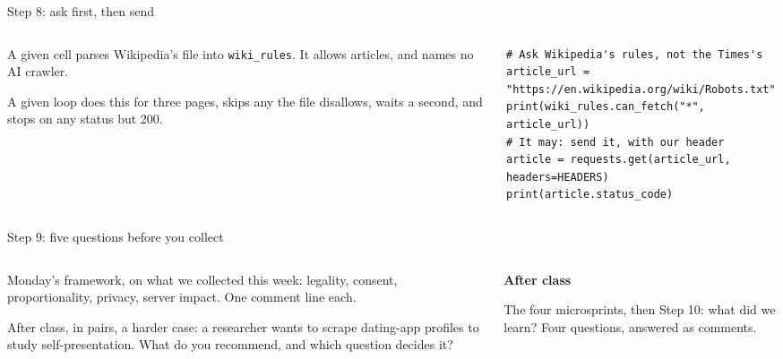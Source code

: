 \documentclass[9pt,aspectratio=169]{beamer}
\begin{document}
\begin{frame}[fragile]{Step 8: ask first, then send}
    \begin{columns}[T]
        \begin{column}{0.37\textwidth}
            A given cell parses Wikipedia's file into \texttt{wiki\_rules}. It allows articles, and names no AI crawler.

            \medskip
            A given loop does this for three pages, skips any the file disallows, waits a second, and stops on any status but 200.
        \end{column}
        \begin{column}{0.6\textwidth}
\begin{lstlisting}[basicstyle=\ttfamily\footnotesize]
# Ask Wikipedia's rules, not the Times's
article_url = "https://en.wikipedia.org/wiki/Robots.txt"
print(wiki_rules.can_fetch("*", article_url))
# It may: send it, with our header
article = requests.get(article_url, headers=HEADERS)
print(article.status_code)
\end{lstlisting}
        \end{column}
    \end{columns}
\end{frame}

\begin{frame}{Step 9: five questions before you collect}
    \begin{columns}[T]
        \begin{column}{0.6\textwidth}
            Monday's framework, on what we collected this week: legality, consent, proportionality, privacy, server impact. One comment line each.

            \medskip
            After class, in pairs, a harder case: a researcher wants to scrape dating-app profiles to study self-presentation. What do you recommend, and which question decides it?
        \end{column}
        \begin{column}{0.35\textwidth}
            \textbf{After class}\\[2pt]
            {\footnotesize The four microsprints, then Step 10: what did we learn? Four questions, answered as comments.\par}
        \end{column}
    \end{columns}
\end{frame}
\end{document}
